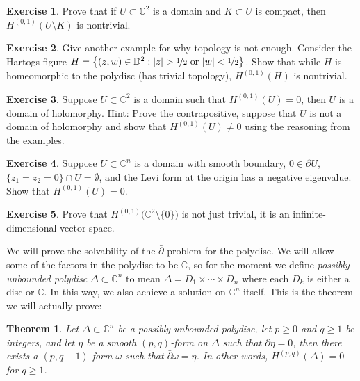 \documentclass[12pt,openany]{book}
\newcommand{\sabs}[1]{\lvert {#1} \rvert}
\newcommand{\C}{{\mathbb{C}}}
\newcommand{\D}{{\mathbb{D}}}
\newcommand{\myindex}[1]{#1\index{#1}}
\theoremstyle{plain}
\newtheorem{thm}{Theorem}[section]
\theoremstyle{remark}
\theoremstyle{definition}
\newenvironment{exbox}{%
    \def\FrameCommand{\vrule width 1pt \relax\hspace{10pt}}%
    \MakeFramed{\advance\hsize-\width\FrameRestore}%
}{%
    \endMakeFramed
}
\theoremstyle{exercise}
\newtheorem{exercise}{Exercise}[section]
\theoremstyle{example}
\begin{document}
\begin{exbox}
\begin{exercise}
Prove that if $U \subset \C^2$ is a domain and $K \subset U$ is compact,
then $H^{(0,1)}(U \setminus K)$ is nontrivial.
\end{exercise}

\begin{exercise}
Give another example for why topology is not enough.  Consider the
Hartogs figure
$H =
\bigl\{ (z,w) \in \D^{2} : \sabs{z} > \nicefrac{1}{2} \text{ or }
\sabs{w} < \nicefrac{1}{2}
\bigr\}$.
Show that while $H$ is homeomorphic to the polydisc (has trivial topology),
$H^{(0,1)}(H)$ is nontrivial.
\end{exercise}

\begin{exercise}
Suppose $U \subset \C^2$ is a domain such that $H^{(0,1)}(U) = 0$,
then $U$ is a domain of holomorphy.
Hint: Prove the contrapositive, suppose that $U$ is not a domain of
holomorphy and show that $H^{(0,1)}(U) \not= 0$ using the reasoning from
the examples.
\end{exercise}

\begin{exercise} \label{exercise:Levinegdol}
Suppose $U \subset \C^n$ is a domain with smooth boundary,
$0 \in \partial U$, $\{ z_1=z_2 =0\} \cap U = \emptyset$, and the Levi form
at the origin has a negative eigenvalue.  Show that
$H^{(0,1)}(U) = 0$.
\end{exercise}

\begin{exercise}
Prove that $H^{(0,1)}\bigl(\C^2 \setminus \{ 0 \} \bigr)$ is not just
trivial, it is an infinite-dimensional vector space.
\end{exercise}
\end{exbox}

We will prove the solvability of the $\bar{\partial}$-problem for the
polydisc.
We will allow some of the factors in the polydisc to be $\C$,
so for the moment we define \emph{\myindex{possibly unbounded polydisc}}
$\Delta \subset \C^n$
to mean $\Delta = D_1 \times \cdots \times D_n$ where
each $D_k$ is either a disc or $\C$.  In this way, we also achieve a
solution on $\C^n$ itself.  This is the theorem we will actually prove:

\begin{thm} \label{thm:dbaronpoly}
Let $\Delta \subset \C^n$ be a possibly unbounded polydisc,
let $p \geq 0$ and $q \geq 1$ be integers, and
let $\eta$ be a smooth $(p,q)$-form on $\Delta$ such that
$\bar{\partial} \eta = 0$, then there exists a $(p,q-1)$-form $\omega$
such that $\bar{\partial} \omega = \eta$.
In other words, $H^{(p,q)}(\Delta) = 0$ for $q \geq 1$.
\end{thm}
\end{document}

